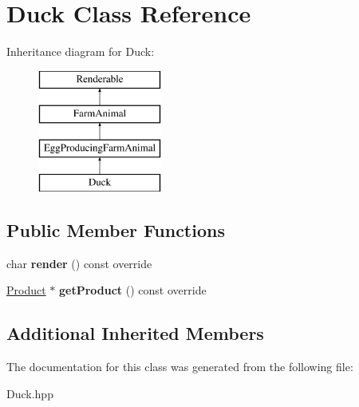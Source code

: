 \hypertarget{class_duck}{}\section{Duck Class Reference}
\label{class_duck}
Inheritance diagram for Duck\+:\begin{figure}[H]
\begin{center}
\leavevmode
\includegraphics[height=4.000000cm]{class_duck}
\end{center}
\end{figure}
\subsection*{Public Member Functions}
\begin{DoxyCompactItemize}
\item 
\mbox{\label{class_duck_affb64b601190dc21ea5fb068e3930f78}} 
char {\bfseries render} () const override
\item 
\mbox{\label{class_duck_a46590448b53940ba9cceace60647682c}} 
\mbox{\hyperlink{class_product}{Product}} $\ast$ {\bfseries get\+Product} () const override
\end{DoxyCompactItemize}
\subsection*{Additional Inherited Members}


The documentation for this class was generated from the following file\+:\begin{DoxyCompactItemize}
\item 
Duck.\+hpp\end{DoxyCompactItemize}
